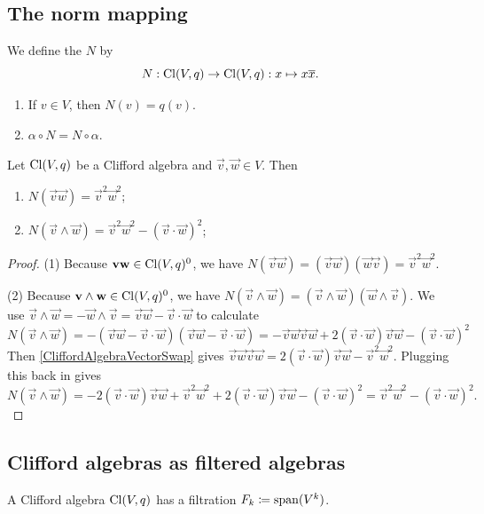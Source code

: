 \subsection{The norm mapping}
\begin{definition}
We define the  $N$ by
\[ N: \operatorname{Cl}(V,q)\to \operatorname{Cl}(V,q): x\mapsto x \overline{x}. \]
\end{definition}
\begin{lemma} \label{normIsQuadraticForm}
\begin{enumerate}
\item If $v\in V$, then $N(v) = q(v)$.
\item $\alpha\circ N = N\circ \alpha$.
\end{enumerate}
\end{lemma}

\begin{proposition}
Let $\operatorname{Cl}(V,q)$ be a Clifford algebra and $\vec{v},\vec{w}\in V$. Then
\begin{enumerate}
\item $N(\vec{v}\vec{w}) = \vec{v}^2 \vec{w}^2$;
\item $N(\vec{v}\wedge \vec{w}) = \vec{v}^2\vec{w}^2 - (\vec{v}\cdot \vec{w})^2$;
\end{enumerate}
\end{proposition}
\begin{proof}
(1) Because $\boldsymbol{\mathrm{v}}\boldsymbol{\mathrm{w}}\in\operatorname{Cl}(V,q)^0$, we have $N(\vec{v}\vec{w}) = (\vec{v}\vec{w})(\vec{w}\vec{v}) = \vec{v}^2 \vec{w}^2$.

(2) Because $\boldsymbol{\mathrm{v}}\wedge \boldsymbol{\mathrm{w}}\in\operatorname{Cl}(V,q)^0$, we have $N(\vec{v}\wedge \vec{w}) = (\vec{v}\wedge \vec{w})(\vec{w}\wedge \vec{v})$. We use $\vec{v}\wedge \vec{w} = -\vec{w}\wedge \vec{v} = \vec{v}\vec{w} - \vec{v}\cdot \vec{w}$ to calculate
\[ N(\vec{v}\wedge \vec{w}) = -(\vec{v}\vec{w} - \vec{v}\cdot \vec{w})(\vec{v}\vec{w} - \vec{v}\cdot \vec{w}) = -\vec{v}\vec{w}\vec{v}\vec{w} + 2(\vec{v}\cdot \vec{w})\vec{v}\vec{w} - (\vec{v}\cdot\vec{w})^2 \]
Then \ref{CliffordAlgebraVectorSwap} gives $\vec{v}\vec{w}\vec{v}\vec{w} = 2 (\vec{v}\cdot \vec{w})\vec{v}\vec{w} - \vec{v}^2 \vec{w}^2$.
Plugging this back in gives
\[ N(\vec{v}\wedge \vec{w}) = -2 (\vec{v}\cdot \vec{w})\vec{v}\vec{w} + \vec{v}^2 \vec{w}^2 + 2(\vec{v}\cdot \vec{w})\vec{v}\vec{w} - (\vec{v}\cdot\vec{w})^2 = \vec{v}^2 \vec{w}^2 - (\vec{v}\cdot\vec{w})^2. \]
\end{proof}


\subsection{Clifford algebras as filtered algebras}
\begin{proposition}
A Clifford algebra $\operatorname{Cl}(V,q)$ has a filtration $F_k \coloneqq \operatorname{span}(V^{k})$.
\end{proposition}

